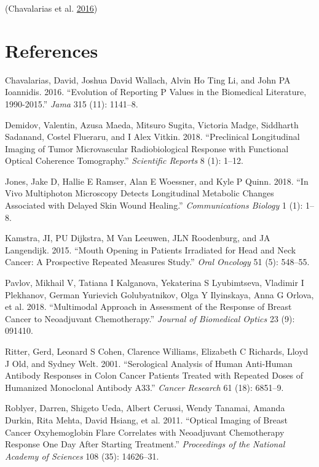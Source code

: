 \documentclass[
]{article}
\begin{document}
(Chavalarias et al. \protect\hyperlink{ref-chavalarias2016}{2016})

\hypertarget{references}{%
\section*{References}\label{references}}

\hypertarget{refs}{}
\leavevmode\hypertarget{ref-chavalarias2016}{}%
Chavalarias, David, Joshua David Wallach, Alvin Ho Ting Li, and John PA
Ioannidis. 2016. ``Evolution of Reporting P Values in the Biomedical
Literature, 1990-2015.'' \emph{Jama} 315 (11): 1141--8.

\leavevmode\hypertarget{ref-demidov2018}{}%
Demidov, Valentin, Azusa Maeda, Mitsuro Sugita, Victoria Madge,
Siddharth Sadanand, Costel Flueraru, and I Alex Vitkin. 2018.
``Preclinical Longitudinal Imaging of Tumor Microvascular
Radiobiological Response with Functional Optical Coherence Tomography.''
\emph{Scientific Reports} 8 (1): 1--12.

\leavevmode\hypertarget{ref-jones2018}{}%
Jones, Jake D, Hallie E Ramser, Alan E Woessner, and Kyle P Quinn. 2018.
``In Vivo Multiphoton Microscopy Detects Longitudinal Metabolic Changes
Associated with Delayed Skin Wound Healing.'' \emph{Communications
Biology} 1 (1): 1--8.

\leavevmode\hypertarget{ref-kamstra2015}{}%
Kamstra, JI, PU Dijkstra, M Van Leeuwen, JLN Roodenburg, and JA
Langendijk. 2015. ``Mouth Opening in Patients Irradiated for Head and
Neck Cancer: A Prospective Repeated Measures Study.'' \emph{Oral
Oncology} 51 (5): 548--55.

\leavevmode\hypertarget{ref-pavlov2018}{}%
Pavlov, Mikhail V, Tatiana I Kalganova, Yekaterina S Lyubimtseva,
Vladimir I Plekhanov, German Yurievich Golubyatnikov, Olga Y Ilyinskaya,
Anna G Orlova, et al. 2018. ``Multimodal Approach in Assessment of the
Response of Breast Cancer to Neoadjuvant Chemotherapy.'' \emph{Journal
of Biomedical Optics} 23 (9): 091410.

\leavevmode\hypertarget{ref-ritter2001}{}%
Ritter, Gerd, Leonard S Cohen, Clarence Williams, Elizabeth C Richards,
Lloyd J Old, and Sydney Welt. 2001. ``Serological Analysis of Human
Anti-Human Antibody Responses in Colon Cancer Patients Treated with
Repeated Doses of Humanized Monoclonal Antibody A33.'' \emph{Cancer
Research} 61 (18): 6851--9.

\leavevmode\hypertarget{ref-roblyer2011}{}%
Roblyer, Darren, Shigeto Ueda, Albert Cerussi, Wendy Tanamai, Amanda
Durkin, Rita Mehta, David Hsiang, et al. 2011. ``Optical Imaging of
Breast Cancer Oxyhemoglobin Flare Correlates with Neoadjuvant
Chemotherapy Response One Day After Starting Treatment.''
\emph{Proceedings of the National Academy of Sciences} 108 (35):
14626--31.
\end{document}
